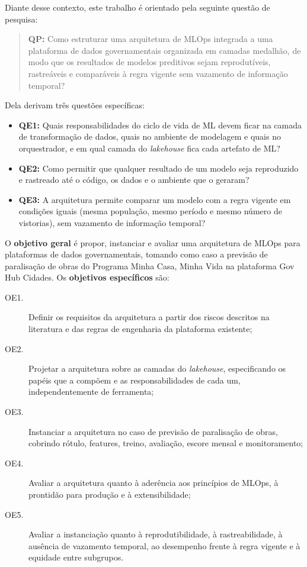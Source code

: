 Diante desse contexto, este trabalho é orientado pela seguinte questão de pesquisa:

\begin{quote}
\textbf{QP:} Como estruturar uma arquitetura de MLOps integrada a uma plataforma de dados governamentais organizada em camadas medalhão, de modo que os resultados de modelos preditivos sejam reprodutíveis, rastreáveis e comparáveis à regra vigente sem vazamento de informação temporal?
\end{quote}

Dela derivam três questões específicas:

\begin{itemize}
	\item \textbf{QE1:} Quais responsabilidades do ciclo de vida de ML devem ficar na camada de transformação de dados, quais no ambiente de modelagem e quais no orquestrador, e em qual camada do \textit{lakehouse} fica cada artefato de ML?
	\item \textbf{QE2:} Como permitir que qualquer resultado de um modelo seja reproduzido e rastreado até o código, os dados e o ambiente que o geraram?
	\item \textbf{QE3:} A arquitetura permite comparar um modelo com a regra vigente em condições iguais (mesma população, mesmo período e mesmo número de vistorias), sem vazamento de informação temporal?
\end{itemize}

O \textbf{objetivo geral} é propor, instanciar e avaliar uma arquitetura de MLOps para plataformas de dados governamentais, tomando como caso a previsão de paralisação de obras do Programa Minha Casa, Minha Vida na plataforma Gov Hub Cidades. Os \textbf{objetivos específicos} são:

\begin{description}
	\item[OE1.] Definir os requisitos da arquitetura a partir dos riscos descritos na literatura e das regras de engenharia da plataforma existente;
	\item[OE2.] Projetar a arquitetura sobre as camadas do \textit{lakehouse}, especificando os papéis que a compõem e as responsabilidades de cada um, independentemente de ferramenta;
	\item[OE3.] Instanciar a arquitetura no caso de previsão de paralisação de obras, cobrindo rótulo, features, treino, avaliação, escore mensal e monitoramento;
	\item[OE4.] Avaliar a arquitetura quanto à aderência aos princípios de MLOps, à prontidão para produção e à extensibilidade;
	\item[OE5.] Avaliar a instanciação quanto à reprodutibilidade, à rastreabilidade, à ausência de vazamento temporal, ao desempenho frente à regra vigente e à equidade entre subgrupos.
\end{description}


